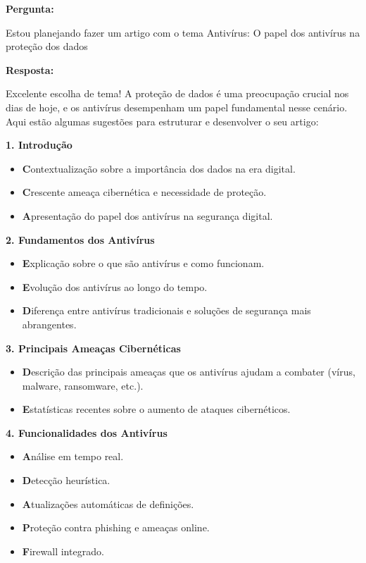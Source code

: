 \documentclass[10pt,conference,twocolumn]{article}
\begin{document}
\textbf{Pergunta:}\newline

Estou planejando fazer um artigo com o tema Antivírus: O papel dos antivírus na proteção dos dados\newline

\textbf{Resposta:}\newline

Excelente escolha de tema! A proteção de dados é uma preocupação crucial nos dias de hoje, e os antivírus desempenham um papel fundamental nesse cenário. Aqui estão algumas sugestões para estruturar e desenvolver o seu artigo:

\textbf {1. Introdução}
\begin{itemize}
\item \textbf Contextualização sobre a importância dos dados na era digital.
\item \textbf Crescente ameaça cibernética e necessidade de proteção.
\item \textbf Apresentação do papel dos antivírus na segurança digital.
\end{itemize}

\textbf {2. Fundamentos dos Antivírus}
\begin{itemize}
\item \textbf Explicação sobre o que são antivírus e como funcionam.
\item \textbf Evolução dos antivírus ao longo do tempo.
\item \textbf Diferença entre antivírus tradicionais e soluções de segurança mais abrangentes.
\end{itemize}

\textbf {3. Principais Ameaças Cibernéticas}
\begin{itemize}
\item \textbf Descrição das principais ameaças que os antivírus ajudam a combater (vírus, malware, ransomware, etc.).
\item \textbf Estatísticas recentes sobre o aumento de ataques cibernéticos.
\end{itemize}

\textbf {4. Funcionalidades dos Antivírus}
 \begin{itemize}
\item \textbf Análise em tempo real.
\item \textbf Detecção heurística.
\item \textbf Atualizações automáticas de definições.
\item \textbf Proteção contra phishing e ameaças online.
\item \textbf Firewall integrado.
\end{itemize}
\end{document}
